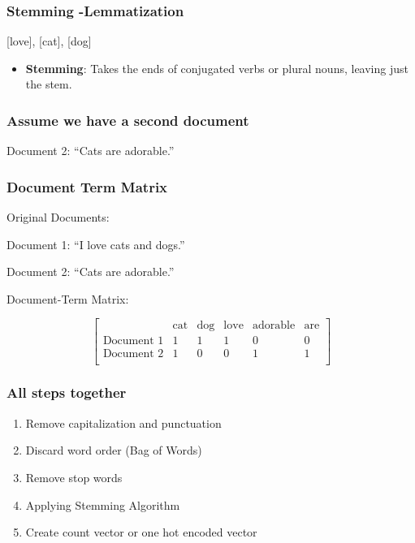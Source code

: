\documentclass[compress, aspectratio=54]{beamer}
\begin{document}
\begin{frame}
\frametitle{Stemming -Lemmatization}
[love], [cat],  [dog] 
\begin{itemize}

\item \textbf{Stemming}: Takes the ends of conjugated verbs or plural nouns, leaving just the stem.
\end{itemize}
\end{frame}


\begin{frame}
\frametitle{Assume we have a second document}
Document 2: ``Cats are adorable.''\\
\end{frame}




\begin{frame}
\frametitle{Document Term Matrix}

Original Documents:

Document 1: ``I love cats and dogs.''

Document 2: ``Cats are adorable.''

Document-Term Matrix:

\[
\begin{bmatrix}
 & \text{{cat}} & \text{{dog}} & \text{{love}} & \text{{adorable}} & \text{{are}} \\
\text{{Document 1}} & 1 & 1 & 1 & 0 & 0 \\
\text{{Document 2}} & 1 & 0 & 0 & 1 & 1 \\
\end{bmatrix}
\]
\end{frame}





\begin{frame}
\frametitle{All steps together}

\begin{enumerate}
\item Remove capitalization and punctuation
\item Discard word order (Bag of Words)
\item Remove stop words
\item Applying Stemming Algorithm
\item Create count vector or one hot encoded vector
\end{enumerate}
\end{frame}
\end{document}
